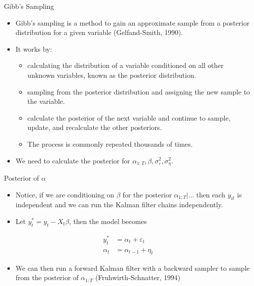 \documentclass[
  ignorenonframetext,
]{beamer}
\providecommand{\tightlist}{%
  \setlength{\itemsep}{0pt}\setlength{\parskip}{0pt}}
\begin{document}
\begin{frame}{Gibb's Sampling}
\protect\hypertarget{gibbs-sampling}{}
\begin{itemize}
\tightlist
\item
  Gibb's sampling is a method to gain an approximate sample from a
  posterior distribution for a given variable (Gelfand-Smith, 1990).
\item
  It works by:

  \begin{itemize}
  \tightlist
  \item
    calculating the distribution of a variable conditioned on all other
    unknown variables, known as the posterior distribution.
  \item
    sampling from the posterior distribution and assigning the new
    sample to the variable.
  \item
    calculate the posterior of the next variable and continue to sample,
    update, and recalculate the other posteriors.
  \item
    The process is commonly repeated thousands of times.
  \end{itemize}
\item
  We need to calculate the posterior for
  \(\alpha_{1:T}, \beta, \sigma^2_{\varepsilon}, \sigma^2_\eta\).
\end{itemize}
\end{frame}

\begin{frame}{Posterior of \(\alpha\)}
\protect\hypertarget{posterior-of-alpha}{}
\begin{itemize}
\tightlist
\item
  Notice, if we are conditioning on \(\beta\) for the posterior
  \(\alpha_{1:T}|...\) then each \(y_{it}\) is independent and we can
  run the Kalman filter chains independently.
\item
  Let \(y^*_t = y_t - X_t \beta\), then the model becomes
\end{itemize}

\begin{equation*}
\begin{aligned}
y^*_t &= \alpha_t +\varepsilon_t\\
\alpha_t &= \alpha_{t-1} + \eta_t
\end{aligned}
\end{equation*}

\begin{itemize}
\tightlist
\item
  We can then run a forward Kalman filter with a backward sampler to
  sample from the posterior of \(\alpha_{1:T}\) (Fruhwirth-Schnatter,
  1994)
\end{itemize}
\end{frame}
\end{document}
